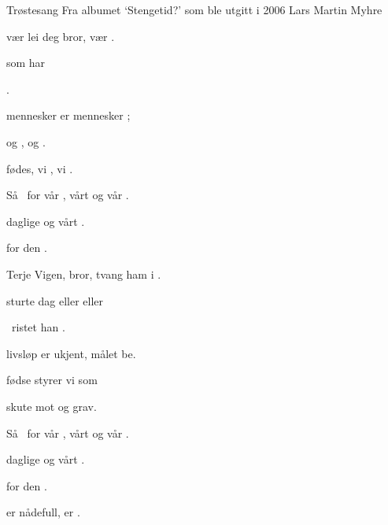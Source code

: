 \begin{SBSong}{Tr\o stesang}
  {Fra albumet `Stengetid?' som ble utgitt i 2006}
  {Lars Martin Myhre}
  \begin{SBVerse}
     v\ae r lei deg bror,  v\ae r .

      som  har 

      .

     mennesker er  mennesker ;

     og ,  og .

     f\o des, vi , vi .
  \end{SBVerse}
  \begin{SBChorus}
    S\aa\  for v\aa r , v\aa rt  og v\aa r .

     daglige  og v\aa rt  .

     for den  .
  \end{SBChorus}
  \begin{SBVerse}
     Terje Vigen, bror,  tvang ham i .

     sturte  dag eller  eller 

    \ ristet han  .

     livsl\o p er ukjent,  m\aa let be.

     f\o dse styrer vi  som 

     skute mot  og  grav.
  \end{SBVerse}
  \begin{SBChorus}
    S\aa\  for v\aa r , v\aa rt  og v\aa r .

     daglige  og v\aa rt  .

     for den  .
  \end{SBChorus}
  \CBPageBrk
  \begin{SBVerse}
     er n\aa defull,  er .


\end{SBVerse}
\end{SBSong}
